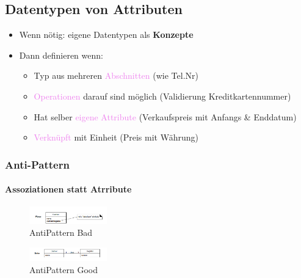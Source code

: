 \documentclass{article}
\begin{document}
\subsection{Datentypen von Attributen}

\begin{itemize}
	\item Wenn nötig: eigene Datentypen als \textbf{Konzepte}
	\item Dann definieren wenn:
	\begin{itemize}
		\item Typ aus mehreren \textcolor {violet}{Abschnitten} (wie Tel.Nr)
		\item \textcolor {violet} {Operationen} darauf sind möglich (Validierung Kreditkartennummer)
		\item Hat selber \textcolor {violet}{eigene Attribute} (Verkaufspreis mit Anfangs \& Enddatum)
		\item \textcolor {violet}{Verknüpft} mit Einheit (Preis mit Währung)
	\end{itemize}
	
\end{itemize}


\subsubsection{Anti-Pattern}

\paragraph{Assoziationen statt Atrribute\\}
\begin{multicols}{2}
\begin{figure}[H]
	\centering
	\includegraphics[width=0.3\textwidth] {Resources/Images/AntiPattern1.png}
	\caption{\label{fig:AntiPattern1}AntiPattern Bad}
	\end{figure}
\columnbreak
\begin{figure}[H]
	\centering
	\includegraphics[width=0.3\textwidth] {Resources/Images/AntiPattern2.png}
	\caption{\label{fig:AntiPattern2}AntiPattern Good}
	\end{figure}
\end{multicols}
\end{document}
